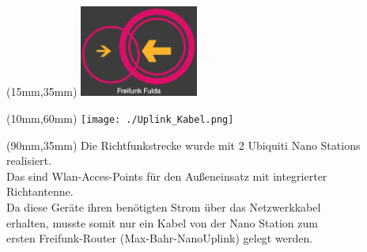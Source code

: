  \newpage
 \begin{textblock*}{40mm}(15mm,35mm)
\includegraphics[height=30mm,width=39mm]{./FFLogo.png}\\
\end{textblock*}

 \begin{textblock*}{190mm}(10mm,60mm)
\texttt{[image: ./Uplink\_Kabel.png]}\\
\end{textblock*}
 \begin{textblock*}{190mm}(90mm,35mm)
Die Richtfunkstrecke wurde mit 2 Ubiquiti Nano Stations realisiert.\\
Das sind Wlan-Acces-Points für den Außeneinsatz mit integrierter \\Richtantenne.\\
Da diese Geräte ihren benötigten Strom über das Netzwerkkabel\\
erhalten, musste somit nur ein Kabel von der Nano Station zum \\
ersten Freifunk-Router (Max-Bahr-NanoUplink) gelegt werden.

\end{textblock*}
















